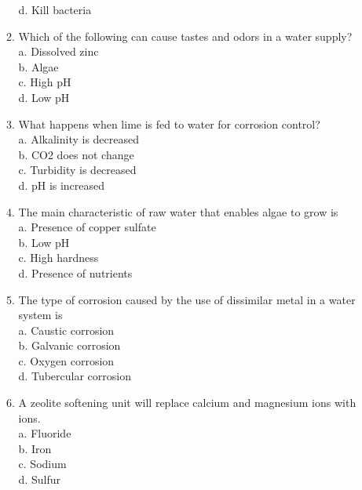 \documentclass[10pt]{article}
\begin{document}
\begin{enumerate}
\begin{enumerate}
d. Kill bacteria\\


\item Which of the following can cause tastes and odors in a water supply?\\
a. Dissolved zinc\\
b. Algae\\
c.  High pH\\
d.  Low pH\\

\item What happens when lime is fed to water for corrosion control?\\


a. Alkalinity is decreased\\

b. CO2 does not change\\

c. Turbidity is decreased\\

d.  pH is increased\\

\item The main characteristic of raw water that enables algae to grow is\\

a. Presence of copper sulfate\\

b. Low pH\\

c. High hardness\\

d. Presence of nutrients\\


\item The type of corrosion caused by the use of dissimilar metal in a water system is\\

a. Caustic corrosion\\

b. Galvanic corrosion\\

c. Oxygen corrosion\\

d. Tubercular corrosion\\

  \item A zeolite softening unit will replace calcium and magnesium ions with ions.\\
a. Fluoride\\
b. Iron\\
c. Sodium\\
d. Sulfur\\


\end{enumerate}
\end{enumerate}
\end{document}
